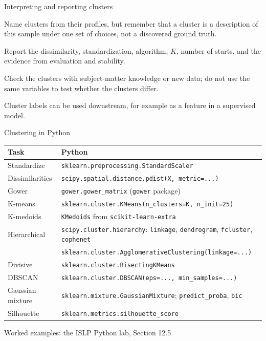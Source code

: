 \begin{frame}{Interpreting and reporting clusters}
    \begin{sitemize}
        \item Name clusters from their profiles, but remember that a cluster is a description of this sample under one set of choices, not a discovered ground truth.
        \item Report the dissimilarity, standardization, algorithm, $K$, number of starts, and the evidence from evaluation and stability.
        \item Check the clusters with subject-matter knowledge or new data; do not use the same variables to test whether the clusters differ.
        \item Cluster labels can be used downstream, for example as a feature in a supervised model.
    \end{sitemize}
\end{frame}


\begin{frame}{Clustering in Python}
    \centering
    \scriptsize
    \begin{tabular}{@{}l l@{}}
        \toprule
        Task & Python \\
        \midrule
        Standardize & \texttt{sklearn.preprocessing.StandardScaler} \\
        Dissimilarities & \texttt{scipy.spatial.distance.pdist(X, metric=...)} \\
        Gower & \texttt{gower.gower\_matrix} (\texttt{gower} package) \\
        K-means & \texttt{sklearn.cluster.KMeans(n\_clusters=K, n\_init=25)} \\
        K-medoids & \texttt{KMedoids} from \texttt{scikit-learn-extra} \\
        Hierarchical & \texttt{scipy.cluster.hierarchy}: \texttt{linkage}, \texttt{dendrogram}, \texttt{fcluster}, \texttt{cophenet} \\
         & \texttt{sklearn.cluster.AgglomerativeClustering(linkage=...)} \\
        Divisive & \texttt{sklearn.cluster.BisectingKMeans} \\
        DBSCAN & \texttt{sklearn.cluster.DBSCAN(eps=..., min\_samples=...)} \\
        Gaussian mixture & \texttt{sklearn.mixture.GaussianMixture}; \texttt{predict\_proba}, \texttt{bic} \\
        Silhouette & \texttt{sklearn.metrics.silhouette\_score} \\
        \bottomrule
    \end{tabular}

    \svspace{0.5em}
    Worked examples: the ISLP Python lab, Section 12.5
\end{frame}

